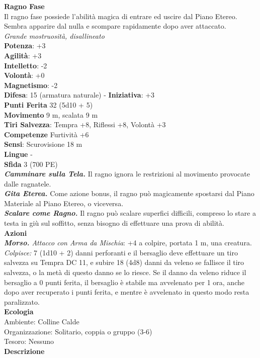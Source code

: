 \begin{multicols}{2}
\medskip\textbf{Ragno Fase}\\
Il ragno fase possiede l'abilità magica di entrare ed uscire dal Piano Etereo. Sembra apparire dal nulla e scompare rapidamente dopo aver attaccato.\\
\emph{Grande mostruosità, disallineato}\\
\textbf{Potenza}: +3\\
\textbf{Agilità}: +3\\
\textbf{Intelletto}: -2\\
\textbf{Volontà}: +0\\
\textbf{Magnetismo}: -2\\
\textbf{Difesa}: 15 (armatura naturale) - \textbf{Iniziativa}: +3\\
\textbf{Punti Ferita} 32 (5d10 + 5)\\
\textbf{Movimento} 9 m, scalata 9 m\\
\textbf{Tiri Salvezza}: Tempra +8, Riflessi +8, Volontà +3 \\
\textbf{Competenze} Furtività +6\\
\textbf{Sensi}: Scurovisione 18 m\\
\textbf{Lingue} -\\
\textbf{Sfida} 3 (700 PE)\smallskip\\
\emph{\textbf{Camminare sulla Tela.}} Il ragno ignora le restrizioni al movimento provocate dalle ragnatele.\\
\emph{\textbf{Gita Eterea.}} Come azione bonus, il ragno può magicamente spostarsi dal Piano Materiale al Piano Etereo, o viceversa.\\
\emph{\textbf{Scalare come Ragno.}} Il ragno può scalare superfici difficili, compreso lo stare a testa in giù sul soffitto, senza bisogno di effettuare una prova di abilità. \\
\smallskip\textbf{Azioni}\\
\emph{\textbf{Morso.} Attacco con Arma da Mischia}: +4 a colpire, portata 1 m, una creatura.\\
\emph{Colpisce:} 7 (1d10 + 2) danni perforanti e il bersaglio deve effettuare un tiro salvezza su Tempra DC 11, e subire 18 (4d8) danni da veleno se fallisce il tiro salvezza, o la metà di questo danno se lo riesce. Se il danno da veleno riduce il bersaglio a 0 punti ferita, il bersaglio è stabile ma avvelenato per 1 ora, anche dopo aver recuperato i punti ferita, e mentre è avvelenato in questo modo resta paralizzato.\\
\textbf{Ecologia}\\
Ambiente: Colline Calde\\
Organizzazione: Solitario, coppia o gruppo (3-6)\\
Tesoro: Nessuno\\
\textbf{Descrizione}\\


\end{multicols}
